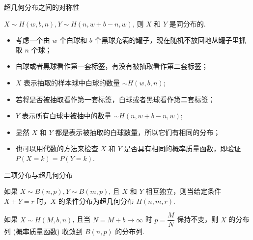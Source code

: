 \documentclass[Prob-All.tex]{subfiles}
\begin{document}
\begin{frame}{超几何分布之间的对称性}
	\begin{thm}
		$X\sim H (w,b,n), Y\sim H (n,w+b-n,w)$, 则 $X$ 和 $Y$ 是同分布的.
	\end{thm}

	\pause
	\zheng
	\begin{itemize}[<+-|alert@+>]
		\item 考虑一个由 $w$ 个白球和 $b$ 个黑球充满的罐子，现在随机不放回地从罐子里抓取 $n$ 个球；
		\item 白球或者黑球看作第一套标签，有没有被抽取看作第二套标签；
		\item $X$ 表示抽取的样本球中白球的数量 $\sim H (w,b,n)$;
		\item 若将是否被抽取看作第一套标签，白球或者黑球看作第二套标签；
		\item $Y$ 表示所有白球中被抽中的数量 $\sim H (n,w+b-n,w)$;
		\item 显然 $X$ 和 $Y$ 都是表示被抽取的白球数量，所以它们有相同的分布；
		\item 也可以用代数的方法来检查 $X$ 和 $Y$ 是否具有相同的概率质量函数，即验证 $P (X=k)=P (Y=k)$.
	\end{itemize}
\end{frame}


\begin{frame}{二项分布与超几何分布}
	\begin{thm}
		如果 $X \sim B (n,p), Y \sim B (m,p)$, 且 $X$ 和 $Y$ 相互独立，则当给定条件 $X+Y=r$ 时，$X$ 的条件分布为超几何分布 $H (n,m,r)$.
	\end{thm}
	\vspace{0.5cm}
	\vspace{0.5cm}
	\begin{thm}
		如果 $X \sim H (M,b,n)$, 且当 $N=M+b \rightarrow \infty$ 时 $p=\dfrac{M}{N}$ 保持不变，则 $X$ 的分布列 (概率质量函数) 收敛到 $B (n,p)$ 的分布列.
	\end{thm}

\end{frame}
\end{document}
